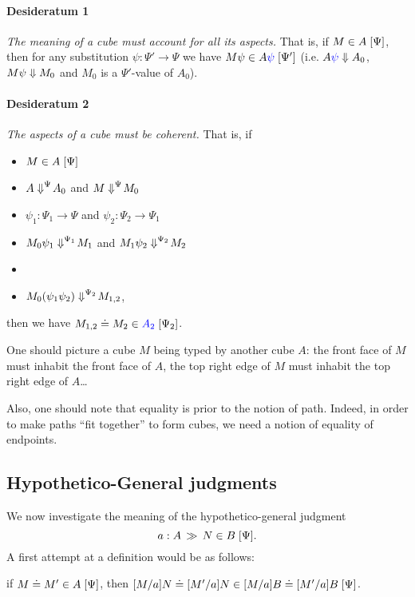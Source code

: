 \documentclass{article}
\begin{document}
\begin{mdframed}
\paragraph{Desideratum 1} 
\emph{The meaning of a cube must account for all its aspects.}
That is, if $\InTypeDim{M}{A}{\Psi}$, then for any substitution
$\psi : \Psi' \to \Psi$ we have $\InTypeDim{M \psi}{A\colored{\psi}}{\Psi'}$
(i.e. $\eval{A\colored{\psi}}{A_0}$, $\eval{M \psi}{M_0}$ and $M_0$ is a
$\Psi'$-value of $A_0$).

\paragraph{Desideratum 2}
\emph{The aspects of a cube must be coherent.} That is, 
if
\begin{itemize}
\item $\InTypeDim{M}{A}{\Psi}$
\item $\evalDim{A}{A_0}{\Psi}$ and $\evalDim{M}{M_0}{\Psi}$
\item $\psi_1 : \Psi_1 \to \Psi$ and $\psi_2 : \Psi_2 \to \Psi_1$
\item $\evalDim{M_0 \psi_1}{M_1}{\Psi_1}$ and $\evalDim{M_1 \psi_2}{M_2}{\Psi_2}$
\item {}
\item $\evalDim{M_0(\psi_1\psi_2)}{M_{1,2}}{\Psi_2}$,
\end{itemize}
then we have $\EqInTypeDim{M_{1,2}}{M_2}{\colored{A_2}}{\Psi_2}$.

\bigskip

\end{mdframed}

\medskip

One should picture a cube $M$ being typed
by another cube $A$: the front face of $M$ must inhabit the front face of $A$,
the top right edge of $M$ must inhabit the top right edge of $A$\dots

Also, one should note that equality is prior to the notion of path. Indeed,
in order to  make paths ``fit together'' to form cubes, we need a notion of
equality of endpoints.


\subsection{Hypothetico-General judgments}

We now investigate the meaning of the hypothetico-general judgment
\[ a : A \, \gg \, \InTypeDim{N}{B}{\Psi}  .\]
A first attempt at a definition would be as follows:
\begin{center}
  if $\EqInTypeDim{M}{M'}{A}{\Psi}$, \quad  then \quad
  $\EqInTypeDim{\subst{M}{a}{N}}{\subst{M'}{a}{N}}{\subst{M}{a}{B} \doteq \subst{M'}{a}{B}}{\Psi}$.
\end{center}
\end{document}
